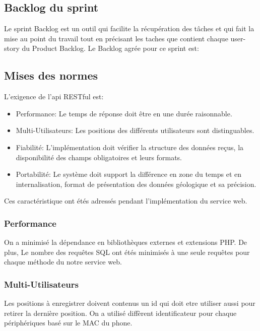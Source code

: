 \subsection{Backlog du sprint}
Le sprint Backlog est un outil qui facilite la récupération des tâches et qui fait
la mise au point du travail tout en précisant les taches que contient chaque
user-story du Product Backlog.
Le Backlog agrée pour ce sprint est:


\subsection{Mises des normes}

L'exigence de l'api RESTful est:
\begin{itemize}
    \item Performance: Le temps de réponse doit être en une durée raisonnable.
    \item Multi-Utilisateurs: Les positions des différents utilisateurs sont
        distinguables.
    \item Fiabilité: L'implémentation doit vérifier la structure des données
        reçus, la disponibilité des champs obligatoires et leurs formats.
    \item Portabilité: Le système doit support la différence en zone du temps
        et en internalisation, format de présentation des données géologique et
        sa précision.
\end{itemize}

Ces caractéristique ont étés adressés pendant l'implémentation du service web.

\subsubsection{Performance}

On a minimisé la dépendance en bibliothèques externes et extensions PHP.
De plus, Le nombre des requêtes SQL ont étés minimisés à une seule requêtes pour
chaque méthode du notre service web.

\subsubsection{Multi-Utilisateurs}

Les positions à enregistrer doivent contenus un id qui doit etre utiliser aussi
pour retirer la dernière position.
On a utilisé diffèrent identificateur pour chaque périphériques basé sur le MAC
du phone.

